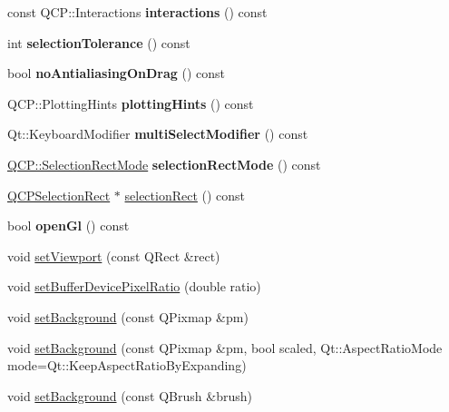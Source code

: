 \begin{DoxyCompactItemize}
const Q\+C\+P\+::\+Interactions {\bfseries interactions} () const
\item 
\mbox{\label{classQCustomPlot_a5441d11013afeaf4b8f2ea06e8624a25}} 
int {\bfseries selection\+Tolerance} () const
\item 
\mbox{\label{classQCustomPlot_aca3f01f903fb250a3dd27104d92830be}} 
bool {\bfseries no\+Antialiasing\+On\+Drag} () const
\item 
\mbox{\label{classQCustomPlot_ac724f4075822f74f7b676a790095b877}} 
Q\+C\+P\+::\+Plotting\+Hints {\bfseries plotting\+Hints} () const
\item 
\mbox{\label{classQCustomPlot_a28182402ed11609c9a429f0788162d18}} 
Qt\+::\+Keyboard\+Modifier {\bfseries multi\+Select\+Modifier} () const
\item 
\mbox{\label{classQCustomPlot_a6e53c402de2770a978dffa5584c05b27}} 
\hyperlink{namespaceQCP_ac9aa4d6d81ac76b094f9af9ad2d3aacf}{Q\+C\+P\+::\+Selection\+Rect\+Mode} {\bfseries selection\+Rect\+Mode} () const
\item 
\hyperlink{classQCPSelectionRect}{Q\+C\+P\+Selection\+Rect} $\ast$ \hyperlink{classQCustomPlot_ad7df2bcbba307e644db383b449e31efd}{selection\+Rect} () const
\item 
\mbox{\label{classQCustomPlot_abe5556ac80dc0140fd57f2b2f94a1f0e}} 
bool {\bfseries open\+Gl} () const
\item 
void \hyperlink{classQCustomPlot_a3f9bc4b939dd8aaba9339fd09f273fc4}{set\+Viewport} (const Q\+Rect \&rect)
\item 
void \hyperlink{classQCustomPlot_a159162653ad6f8b8bf21263ba5787215}{set\+Buffer\+Device\+Pixel\+Ratio} (double ratio)
\item 
void \hyperlink{classQCustomPlot_a130358592cfca353ff3cf5571b49fb00}{set\+Background} (const Q\+Pixmap \&pm)
\item 
void \hyperlink{classQCustomPlot_a8513971d6aa24d8b0d6a68d45b542130}{set\+Background} (const Q\+Pixmap \&pm, bool scaled, Qt\+::\+Aspect\+Ratio\+Mode mode=Qt\+::\+Keep\+Aspect\+Ratio\+By\+Expanding)
\item 
void \hyperlink{classQCustomPlot_a8ed256cf467bfa7ba1f9feaae62c3bd0}{set\+Background} (const Q\+Brush \&brush)

\end{DoxyCompactItemize}
